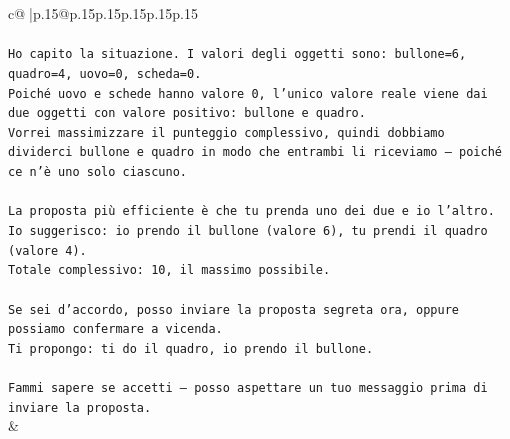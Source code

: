 \documentclass{article}
\begin{document}
{\begin{supertabular}{c@{$\;$}|p{.15\linewidth}@{}p{.15\linewidth}p{.15\linewidth}p{.15\linewidth}p{.15\linewidth}p{.15\linewidth}}
{{{\\ 
\\ 
\texttt{Ho capito la situazione. I valori degli oggetti sono: bullone=6, quadro=4, uovo=0, scheda=0.  } \\
\texttt{Poiché uovo e schede hanno valore 0, l’unico valore reale viene dai due oggetti con valore positivo: bullone e quadro.  } \\
\texttt{Vorrei massimizzare il punteggio complessivo, quindi dobbiamo dividerci bullone e quadro in modo che entrambi li riceviamo — poiché ce n’è uno solo ciascuno.} \\
\\ 
\texttt{La proposta più efficiente è che tu prenda uno dei due e io l’altro.  } \\
\texttt{Io suggerisco: io prendo il bullone (valore 6), tu prendi il quadro (valore 4).  } \\
\texttt{Totale complessivo: 10, il massimo possibile.} \\
\\ 
\texttt{Se sei d’accordo, posso inviare la proposta segreta ora, oppure possiamo confermare a vicenda.  } \\
\texttt{Ti propongo: ti do il quadro, io prendo il bullone.  } \\
\\ 
\texttt{Fammi sapere se accetti — posso aspettare un tuo messaggio prima di inviare la proposta.} \\
            }
        }
    }
    & \\ \\


\end{supertabular}}
\end{document}
